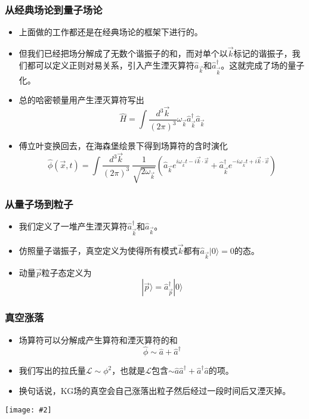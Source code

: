 \documentclass[CJK]{beamer}
\newcommand{\lag}{\mathcal{L}}
\newcommand{\cpic}[2]{
\begin{center}
\texttt{[image: \#2]}
\end{center}
}
\begin{document}
\begin{frame}
\frametitle{\bch 从经典场论到量子场论 \ech}
\bch
\begin{itemize}
\item 上面做的工作都还是在经典场论的框架下进行的。
\item 但我们已经把场分解成了无数个谐振子的和，而对单个以$\vec k$标记的谐振子，我们都可以定义正则对易关系，引入产生湮灭算符$\hat a_{\vec k}$和$\hat{a}_{\vec k}^\dagger$。这就完成了场的量子化。
\item 总的哈密顿量用产生湮灭算符写出
$$
\hat H = \int \frac{d^3 \vec k}{(2\pi)^3} \omega_{\vec k} \hat{a}^\dagger_{\vec k} \hat{a}_{\vec k}
$$
\item 傅立叶变换回去，在海森堡绘景下得到场算符的含时演化
$$
\hat \phi (\vec x,t) = \int \frac{d^3 \vec k}{(2\pi)^3} \ \frac{1}{\sqrt{2\omega_{\vec k}}}\left( \hat{a}_{\vec k} e^{i\omega_{\vec k} t - i \vec k \cdot \vec x} + \hat{a}^\dagger_{\vec k} e^{-i\omega_{\vec k} t + i \vec k \cdot \vec x} \right)
$$
\end{itemize}
\ech
\end{frame}



\begin{frame}
\frametitle{\bch 从量子场到粒子 \ech}
\bch
\begin{itemize}
\item 我们定义了一堆产生湮灭算符$\hat{a}_{\vec k}^\dagger$和$\hat{a}_{\vec k}$。\item 仿照量子谐振子，真空定义为使得所有模式$\vec k$都有$\hat a_{\vec k} | 0 \rangle = 0$的态。
\item 动量$\vec p$粒子态定义为
$$
| \vec p \rangle = \hat{a}_{\vec p}^\dagger |0\rangle
$$
\end{itemize}
\ech
\end{frame}

\begin{frame}
\frametitle{\bch 真空涨落 \ech}
\bch
\begin{itemize}
\item 场算符可以分解成产生算符和湮灭算符的和
$$
\hat \phi \sim \hat a + \hat a^\dagger
$$
\item 我们写出的拉氏量$\lag \sim \phi^2$，也就是$\lag$包含$\sim \hat a \hat a^\dagger + \hat a^\dagger \hat a$的项。
\item 换句话说，KG场的真空会自己涨落出粒子然后经过一段时间后又湮灭掉。
\end{itemize}
\cpic{0.13}{scare}
\ech
\end{frame}
\end{document}
